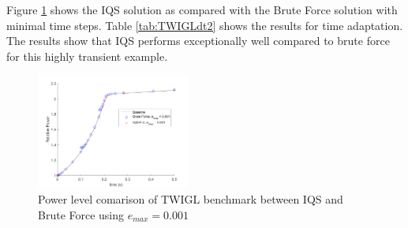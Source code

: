 \documentclass{anstrans}
\begin{document}
\begin{table}[htp]
\begin{center}
\end{center}
\caption{TWIGL material properties and ramp perturbation}
\label{tab:TWIGL_mat}
\end{table}

Figure \ref{fig:TWIGL_power} shows the IQS  solution as compared with the Brute Force solution with minimal time steps.  Table \ref{tab:TWIGLdt2} shows the results for time adaptation.  The results show that IQS performs exceptionally well compared to brute force for this highly transient example.

\begin{figure}[!htbp]
\centering
\includegraphics[width=0.45\textwidth]{TWIGL_power_plot.png}
\caption{Power level comarison of TWIGL benchmark between IQS and Brute Force using $e_{max} = 0.001$}
\label{fig:TWIGL_power}
\end{figure}
\end{document}
